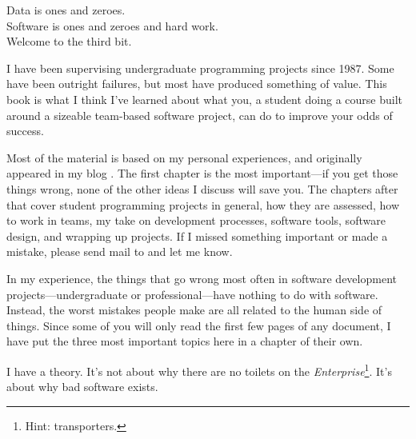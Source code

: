 \documentclass{report}
\begin{document}
\begin{center}\begin{em}
Data is ones and zeroes. \\
Software is ones and zeroes and hard work. \\
Welcome to the third bit.
\end{em}\end{center}

I have been supervising undergraduate programming projects since 1987.
Some have been outright failures, but most have produced something of
value.  This book is what I think I've learned about what you, a
student doing a course built around a sizeable team-based software
project, can do to improve your odds of success.

Most of the material is based on my personal experiences, and
originally appeared in my blog \cite{b:third-bit-blog}.  The first
chapter is the most important---if you get those things wrong, none of
the other ideas I discuss will save you.  The chapters after that
cover student programming projects in general, how they are assessed,
how to work in teams, my take on development processes, software
tools, software design, and wrapping up projects.  If I missed
something important or made a mistake, please send mail to
 and let me know.


In my experience, the things that go wrong most often in software
development projects---undergraduate or professional---have nothing to
do with software.  Instead, the worst mistakes people make are all
related to the human side of things.  Since some of you will only read
the first few pages of any document, I have put the three most
important topics here in a chapter of their own.


I have a theory.  It's not about why there are no toilets on the
\emph{Enterprise}\footnote{Hint: transporters.}.  It's about why bad
software exists.
\end{document}
